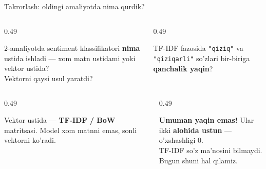 \documentclass[aspectratio=169,11pt]{beamer}
\begin{document}
\begin{frame}{Takrorlash: oldingi amaliyotda nima qurdik?}
  \begin{columns}[T]
    \begin{column}{0.49\textwidth}
      \begin{tcolorbox}[warnbox,title=1-savol]
        \small
        2-amaliyotda sentiment klassifikatori \textbf{nima} ustida ishladi ---
        xom matn ustidami yoki vektor ustida?\\[3pt]
        \footnotesize Vektorni qaysi usul yaratdi?
      \end{tcolorbox}
    \end{column}
    \begin{column}{0.49\textwidth}
      \begin{tcolorbox}[warnbox,title=2-savol]
        \small
        TF-IDF fazosida \texttt{"qiziq"} va \texttt{"qiziqarli"}
        so'zlari bir-biriga \textbf{qanchalik yaqin}?
      \end{tcolorbox}
    \end{column}
  \end{columns}
  \pause
  \vspace{4pt}
  \begin{columns}[T]
    \begin{column}{0.49\textwidth}
      \begin{tcolorbox}[okbox,title=1-javob]
        \small
        Vektor ustida --- \textbf{TF-IDF / BoW} matritsasi.
        Model xom matnni emas, sonli vektorni ko'radi.
      \end{tcolorbox}
    \end{column}
    \begin{column}{0.49\textwidth}
      \begin{tcolorbox}[okbox,title=2-javob]
        \small
        \textbf{Umuman yaqin emas!} Ular ikki \textbf{alohida ustun} ---
        o'xshashligi $0$.\\
        \footnotesize\textcolor{halfgray}{TF-IDF so'z ma'nosini bilmaydi. Bugun shuni hal qilamiz.}
      \end{tcolorbox}
    \end{column}
  \end{columns}
\end{frame}
\end{document}
